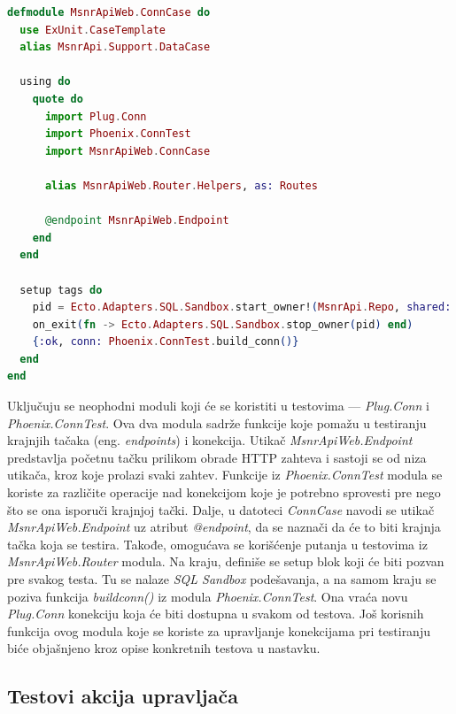 \documentclass[12pt,oneside]{memoir}
\begin{document}
\begin{lstlisting}[language=elixir, caption={Modul \emph{ConnCase}},captionpos=b, label={lst:conncase}]
defmodule MsnrApiWeb.ConnCase do
  use ExUnit.CaseTemplate
  alias MsnrApi.Support.DataCase

  using do
    quote do
      import Plug.Conn
      import Phoenix.ConnTest
      import MsnrApiWeb.ConnCase

      alias MsnrApiWeb.Router.Helpers, as: Routes

      @endpoint MsnrApiWeb.Endpoint
    end
  end

  setup tags do
    pid = Ecto.Adapters.SQL.Sandbox.start_owner!(MsnrApi.Repo, shared: not tags[:async])
    on_exit(fn -> Ecto.Adapters.SQL.Sandbox.stop_owner(pid) end)
    {:ok, conn: Phoenix.ConnTest.build_conn()}
  end
end
\end{lstlisting}

\par Uključuju se neophodni moduli koji će se koristiti u testovima --- \emph{Plug.Conn} i \emph{Phoenix.ConnTest}. Ova dva modula sadrže funkcije koje pomažu u testiranju krajnjih tačaka (eng. \emph{endpoints}) i konekcija. Utikač \emph{MsnrApiWeb.Endpoint} predstavlja početnu tačku prilikom obrade HTTP zahteva i sastoji se od niza utikača, kroz koje prolazi svaki zahtev. Funkcije iz \emph{Phoenix.ConnTest} modula se koriste za različite operacije nad konekcijom koje je potrebno sprovesti pre nego što se ona isporuči krajnjoj tački. Dalje, u datoteci \emph{ConnCase} navodi se utikač \emph{MsnrApiWeb.Endpoint} uz atribut \emph{@endpoint}, da se naznači da će to biti krajnja tačka koja se testira. Takođe, omogućava se korišćenje putanja u testovima iz \emph{MsnrApiWeb.Router} modula. Na kraju, definiše se setup blok koji će biti pozvan pre svakog testa. Tu se nalaze \emph{SQL Sandbox} podešavanja, a na samom kraju se poziva funkcija \emph{build{\textunderscore}conn()} iz modula \emph{Phoenix.ConnTest}. Ona vraća novu \emph{Plug.Conn} konekciju koja će biti dostupna u svakom od testova. Još korisnih funkcija ovog modula koje se koriste za upravljanje konekcijama pri testiranju biće objašnjeno kroz opise konkretnih testova u nastavku.

\subsection{Testovi akcija upravljača}
\end{document}
